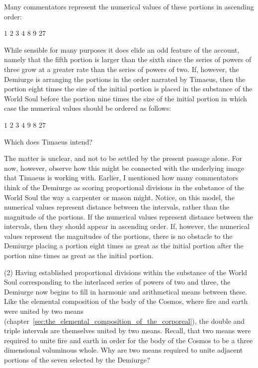 Many commentators represent the numerical values of these portions in ascending order:
\begin{center}
	\( 1 \) \( 2 \) \( 3 \) \( 4 \) \( 8 \) \( 9 \) \( 27 \)
\end{center}
While sensible for many purposes it does elide an odd feature of the account, namely that the fifth portion is larger than the sixth since the series of powers of three grow at a greater rate than the series of powers of two. If, however, the Demiurge is arranging the portions in the order narrated by Timaeus, then the portion eight times the size of the initial portion is placed in the substance of the World Soul before the portion nine times the size of the initial portion in which case the numerical values should be ordered as follows:
\begin{center}
	\( 1 \) \( 2 \) \( 3 \) \( 4 \) \( 9 \) \( 8 \) \( 27 \)
\end{center}
Which does Timaeus intend?

The matter is unclear, and not to be settled by the present passage alone. For now, however, observe how this might be connected with the underlying image that Timaeus is working with. Earlier, I mentioned how many commentators think of the Demiurge as scoring proportional divisions in the substance of the World Soul the way a carpenter or mason might. Notice, on this model, the numerical values represent distance between the intervals, rather than the magnitude of the portions. If the numerical values represent distance between the intervals, then they should appear in ascending order. If, however, the numerical values represent the magnitudes of the portions, there is no obstacle to the Demiurge placing a portion eight times as great as the initial portion after the portion nine times as great as the initial portion. 

(2) Having established proportional divisions within the substance of the World Soul corresponding to the interlaced series of powers of two and three, the Demiurge now begins to fill in harmonic and arithmetical means between these. Like the elemental composition of the body of the Cosmos, where fire and earth were united by two means (chapter~\ref{sec:the_elemental_composition_of_the_corporeal}), the double and triple intervals are themselves united by two means. Recall, that two means were required to unite fire and earth in order for the body of the Cosmos to be a three dimensional voluminous whole. Why are two means required to unite adjacent portions of the seven selected by the Demiurge?

